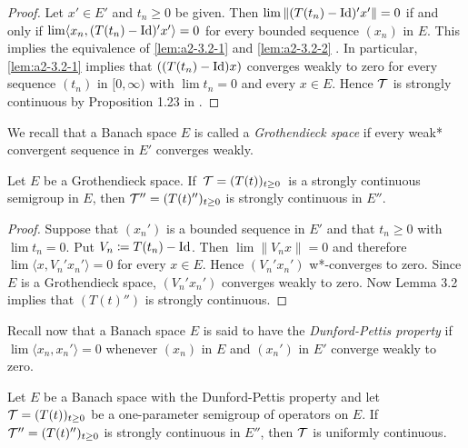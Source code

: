 \begin{proof}
Let $x' \in E'$ and $t_n \geq 0$ be given.
Then $\lim \|(T(t_n) - \operatorname{Id})'x'\| = 0$ if and only if $\lim \langle x_n, (T(t_n) - \operatorname{Id})'x' \rangle = 0$ for every bounded sequence $(x_n)$ in $E$.
This implies the equivalence of \ref{lem:a2-3.2-1}   and \ref{lem:a2-3.2-2} . 
In particular, \ref{lem:a2-3.2-1}   implies that $((T(t_n) - \operatorname{Id})x)$ converges weakly to zero for every sequence $(t_n)$ in $[0,\infty)$ with $\lim t_n = 0$ and every $x \in E$.
Hence $\mathcal{T}$ is strongly continuous by Proposition 1.23 
in \citet{davies:1980}.
\end{proof}

We recall that a Banach space $E$ is called a \emph{Grothendieck space} if every weak* convergent sequence in $E'$ converges weakly.
\begin{theorem}\label{thm:a2-3.3}
Let $E$ be a Grothendieck space.
If \,$\mathcal{T}=(T(t))_{t \geq 0}$\, is a strongly continuous semigroup in $E$, then $\mathcal{T}'' = (T(t)'')_{t \geq 0}$ is strongly continuous in $E''$.
\end{theorem}

\begin{proof}
Suppose that $(x_{n}')$ is a bounded sequence in $E'$ and that $t_{n} \geq 0$ with $\lim t_{n} = 0$.
Put $V_{n} \coloneqq T(t_{n}) - \operatorname{Id}$.
Then $\lim \|V_{n}x\| = 0$ and therefore $\lim \langle x, V_{n}'x_{n}' \rangle = 0$ for every $x \in E$.
Hence $(V_{n}'x_{n}')$ w*-converges to zero.
Since $E$ is a Grothendieck space, $(V_{n}'x_{n}')$ converges weakly to zero.
Now Lemma 3.2 implies that $(T(t)'')$ is strongly continuous.
\end{proof}

Recall now that a Banach space $E$ is said to have the \emph{Dunford-Pettis property} if $\lim \langle x_{n},x_{n}' \rangle = 0$ whenever $(x_{n})$ in $E$ and $(x_{n}')$ in $E'$ converge weakly to zero.

\begin{theorem}\label{thm:a2-3.4}
Let $E$ be a Banach space with the Dunford-Pettis property and let \,$\mathcal{T} = (T(t))_{t \geq 0}$ be a one-parameter semigroup of operators on $E$.
If \,$\mathcal{T}'' = (T(t)'')_{t \geq 0}$ is strongly continuous in $E''$, then $\mathcal{T}$ is uniformly continuous.
\end{theorem}

